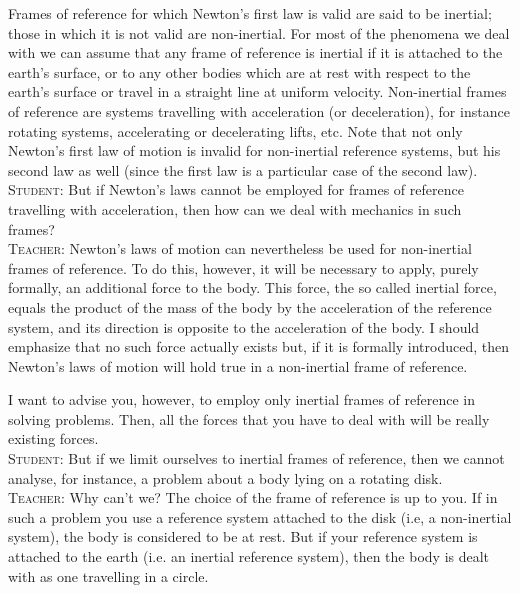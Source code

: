 \documentclass[a4paper,sfsidenotes]{tufte-book}
\begin{document}
Frames of reference for which Newton's first law is valid are said to be inertial; those in which it is not valid are non-inertial. For most of the phenomena we deal with we can assume that any frame of reference is inertial if it is attached to the earth's surface, or to any other bodies which are at rest
with respect to the earth's surface or travel in a straight line at uniform velocity. Non-inertial frames of reference are systems travelling with acceleration (or deceleration), for instance rotating systems, accelerating or decelerating lifts, etc. Note that not only Newton's first law of motion is invalid for non-inertial reference systems, but his second law as well (since the first law is a particular case of the second law).\\
\textsc{Student:} But if Newton's laws cannot be employed for frames of reference travelling with acceleration, then how can we deal with mechanics in such frames?\\
\textsc{Teacher:} Newton's laws of motion can nevertheless be used for non-inertial frames of reference. To do this, however, it will be necessary to apply, purely formally, an additional
force to the body. This force, the so called inertial force, equals the product of the mass of the body by the acceleration of the reference system, and its direction is opposite to the acceleration of the body. I should emphasize that no such force actually exists but, if it is formally introduced, then Newton's laws of motion will hold true in a non-inertial frame of reference.

I want to advise you, however, to employ only inertial frames of reference in solving problems. Then, all the forces that you have to deal with will be really existing forces.\\
\textsc{Student:} But if we limit ourselves to inertial frames of reference, then we cannot analyse, for instance, a problem about a body lying on a rotating disk.\\
\textsc{Teacher:} Why can't we? The choice of the frame of reference is up to you. If in such a problem you use a reference system attached to the disk (i.e, a non-inertial system), the body is considered to be at rest. But if your reference system is attached to the earth (i.e. an inertial reference system), then the body is dealt with as one travelling in a circle.
\end{document}
